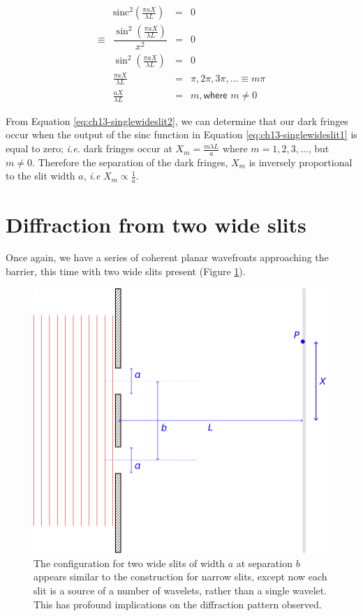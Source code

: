 \documentclass[
]{book}
\begin{document}
\begin{equation}
\begin{array}{rrcl}
&\mathrm{sinc}^2 \left(\frac{\pi a X}{\lambda L}\right) &=& 0 \\
\equiv & \dfrac{\sin^2 \left(\frac{\pi a X}{\lambda L}\right)}{x^2 }&=& 0 \\
& \sin^2 \left(\frac{\pi a X}{\lambda L}\right) &=& 0 \\
& \frac{\pi a X}{\lambda L} &=& \pi, 2\pi, 3\pi, \dots \equiv m \pi \\
& \frac{ a X}{\lambda L} &=& m , \textsf{where } m \neq 0
\end{array}
\label{eq:ch13-singlewideslit2}
\end{equation}

From Equation \eqref{eq:ch13-singlewideslit2}, we can determine that our dark fringes occur when the output of the sinc function in Equation \eqref{eq:ch13-singlewideslit1} is equal to zero; \emph{i.e.} dark fringes occur at \(X_m = \frac{m\lambda L}{a}\) where \(m = 1, 2, 3, \dots\), but \(m \neq 0\). Therefore the separation of the dark fringes, \(X_m\) is inversely proportional to the slit width \(a\), \emph{i.e} \(X_m \propto \frac{1}{a}\).

\hypertarget{sec-ch13-difftwowideslits}{%
\section{Diffraction from two wide slits}\label{sec-ch13-difftwowideslits}}

Once again, we have a series of coherent planar wavefronts approaching the barrier, this time with two wide slits present (Figure \ref{fig:ch13-twowideslits1}).

\begin{figure}

{\centering \includegraphics[width=0.7\linewidth]{visualisations/LaTeX/ch13-doubleslitswide1} 

}

\caption{The configuration for two wide slits of width $a$ at separation $b$ appears similar to the construction for narrow slits, except now each slit is a source of a number of wavelets, rather than a single wavelet. This has profound implications on the diffraction pattern observed.}\label{fig:ch13-twowideslits1}
\end{figure}
\end{document}

